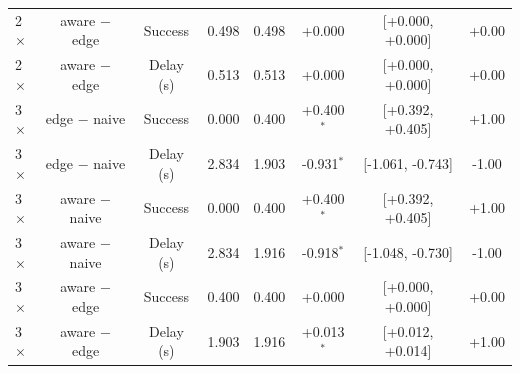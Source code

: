 \begin{table}
\begin{tabular}{lccccccc}
2$\times$ & aware $-$ edge & Success & 0.498 & 0.498 & +0.000 & [+0.000, +0.000] & +0.00 \\
2$\times$ & aware $-$ edge & Delay (s) & 0.513 & 0.513 & +0.000 & [+0.000, +0.000] & +0.00 \\
3$\times$ & edge $-$ naive & Success & 0.000 & 0.400 & +0.400$^{*}$ & [+0.392, +0.405] & +1.00 \\
3$\times$ & edge $-$ naive & Delay (s) & 2.834 & 1.903 & -0.931$^{*}$ & [-1.061, -0.743] & -1.00 \\
3$\times$ & aware $-$ naive & Success & 0.000 & 0.400 & +0.400$^{*}$ & [+0.392, +0.405] & +1.00 \\
3$\times$ & aware $-$ naive & Delay (s) & 2.834 & 1.916 & -0.918$^{*}$ & [-1.048, -0.730] & -1.00 \\
3$\times$ & aware $-$ edge & Success & 0.400 & 0.400 & +0.000 & [+0.000, +0.000] & +0.00 \\
3$\times$ & aware $-$ edge & Delay (s) & 1.903 & 1.916 & +0.013$^{*}$ & [+0.012, +0.014] & +1.00 \\
\bottomrule
\end{tabular}
\par{}
\end{table}

